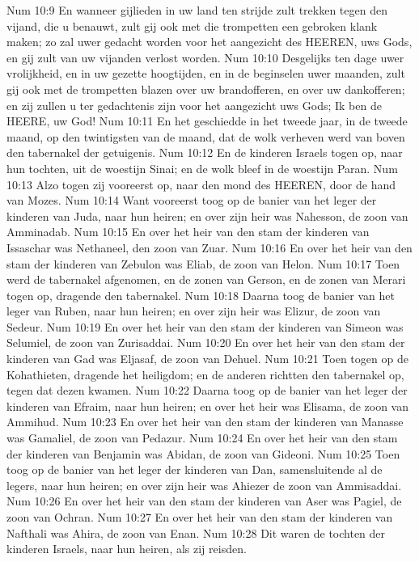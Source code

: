 Num 10:9  En wanneer gijlieden in uw land ten strijde zult trekken tegen den vijand, die u benauwt, zult gij ook met die trompetten een gebroken klank maken; zo zal uwer gedacht worden voor het aangezicht des HEEREN, uws Gods, en gij zult van uw vijanden verlost worden.
Num 10:10  Desgelijks ten dage uwer vrolijkheid, en in uw gezette hoogtijden, en in de beginselen uwer maanden, zult gij ook met de trompetten blazen over uw brandofferen, en over uw dankofferen; en zij zullen u ter gedachtenis zijn voor het aangezicht uws Gods; Ik ben de HEERE, uw God!
Num 10:11  En het geschiedde in het tweede jaar, in de tweede maand, op den twintigsten van de maand, dat de wolk verheven werd van boven den tabernakel der getuigenis.
Num 10:12  En de kinderen Israels togen op, naar hun tochten, uit de woestijn Sinai; en de wolk bleef in de woestijn Paran.
Num 10:13  Alzo togen zij vooreerst op, naar den mond des HEEREN, door de hand van Mozes.
Num 10:14  Want vooreerst toog op de banier van het leger der kinderen van Juda, naar hun heiren; en over zijn heir was Nahesson, de zoon van Amminadab.
Num 10:15  En over het heir van den stam der kinderen van Issaschar was Nethaneel, den zoon van Zuar.
Num 10:16  En over het heir van den stam der kinderen van Zebulon was Eliab, de zoon van Helon.
Num 10:17  Toen werd de tabernakel afgenomen, en de zonen van Gerson, en de zonen van Merari togen op, dragende den tabernakel.
Num 10:18  Daarna toog de banier van het leger van Ruben, naar hun heiren; en over zijn heir was Elizur, de zoon van Sedeur.
Num 10:19  En over het heir van den stam der kinderen van Simeon was Selumiel, de zoon van Zurisaddai.
Num 10:20  En over het heir van den stam der kinderen van Gad was Eljasaf, de zoon van Dehuel.
Num 10:21  Toen togen op de Kohathieten, dragende het heiligdom; en de anderen richtten den tabernakel op, tegen dat dezen kwamen.
Num 10:22  Daarna toog op de banier van het leger der kinderen van Efraim, naar hun heiren; en over het heir was Elisama, de zoon van Ammihud.
Num 10:23  En over het heir van den stam der kinderen van Manasse was Gamaliel, de zoon van Pedazur.
Num 10:24  En over het heir van den stam der kinderen van Benjamin was Abidan, de zoon van Gideoni.
Num 10:25  Toen toog op de banier van het leger der kinderen van Dan, samensluitende al de legers, naar hun heiren; en over zijn heir was Ahiezer de zoon van Ammisaddai.
Num 10:26  En over het heir van den stam der kinderen van Aser was Pagiel, de zoon van Ochran.
Num 10:27  En over het heir van den stam der kinderen van Nafthali was Ahira, de zoon van Enan.
Num 10:28  Dit waren de tochten der kinderen Israels, naar hun heiren, als zij reisden.
